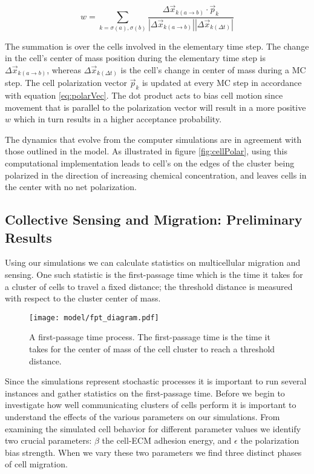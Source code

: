 \documentclass[a4paper]{article}
\begin{document}
\begin{equation}
    w = \sum_{k=\sigma(a),\sigma(b)} \frac{\Delta\vec{x}_{k(a \to b)} \cdot \vec{p}_k}{ |\Delta\vec{x}_{k(a \to b)}| |\Delta\vec{x}_{k(\Delta t)}|}
\end{equation}

The summation is over the cells involved in the elementary time step. The change in the cell's center of mass position during the elementary time step is $\Delta\vec{x}_{k(a \to b)}$, whereas $\Delta\vec{x}_{k(\Delta t)}$ is the cell's change in center of mass during a MC step. The cell polarization vector $\vec{p}_k$ is updated at every MC step in accordance with equation \eqref{eq:polarVec}. The dot product acts to bias cell motion since movement that is parallel to the polarization vector will result in a more positive $w$ which in turn results in a higher acceptance probability.

The dynamics that evolve from the computer simulations are in agreement with those outlined in the model. As illustrated in figure \ref{fig:cellPolar}, using this computational implementation leads to cell's on the edges of the cluster being polarized in the direction of increasing chemical concentration, and leaves cells in the center with no net polarization.

\subsection{Collective Sensing and Migration: Preliminary Results}

Using our simulations we can calculate statistics on multicellular migration and sensing. One such statistic is the first-passage time which is the time it takes for a cluster of cells to travel a fixed distance; the threshold distance is measured with respect to the cluster center of mass.

\begin{figure}
    \centering
        \texttt{[image: model/fpt\_diagram.pdf]}
    \caption{A first-passage time process. The first-passage time is the time it takes for the center of mass of the cell cluster to reach a threshold distance.} \label{fig:fpt}
\end{figure}

Since the simulations represent stochastic processes it is important to run several instances and gather statistics on the first-passage time. Before we begin to investigate how well communicating clusters of cells perform it is important to understand the effects of the various parameters on our simulations. From examining the simulated cell behavior for different parameter values we identify two crucial parameters: $\beta$ the cell-ECM adhesion energy, and $\epsilon$ the polarization bias strength. When we vary these two parameters we find three distinct phases of cell migration.
\end{document}
